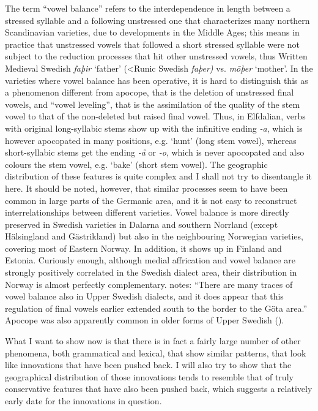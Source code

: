 The term “vowel balance” refers to the interdependence in length between a stressed syllable and a following unstressed one that characterizes many northern Scandinavian varieties, due to developments in the Middle Ages; this means in practice that unstressed vowels that followed a short stressed syllable were not subject to the reduction processes that hit other unstressed vowels, thus Written Medieval Swedish \textit{faþir }‘father’\textit{ }({\textless}Runic Swedish\textit{ faþer)} vs. \textit{m}\textit{\=oþ}\textit{er} ‘mother’.  In the varieties where vowel balance has been operative, it is hard to distinguish this as a phenomenon different from apocope, that is the deletion of unstressed final vowels, and “vowel leveling”, that is the assimilation of the quality of the stem vowel to that of the non-deleted but raised final vowel. Thus, in Elfdalian, verbs with original long-syllabic stems show up with the infinitive ending\textit{ {}-a}, which is however apocopated in many positions, e.g.  ‘hunt’ (long stem vowel), whereas short-syllabic stems get the ending\textit{ {}-å} or\textit{ {}-o}, which is never apocopated and also colours the stem vowel, e.g.  ‘bake’ (short stem vowel). The geographic distribution of these features is quite complex and I shall not try to disentangle it here. It should be noted, however, that similar processes seem to have been common in large parts of the Germanic area, and it is not easy to reconstruct interrelationships between different varieties. Vowel balance is more directly preserved in Swedish varieties in Dalarna and southern Norrland (except Hälsingland and Gästrikland) but also in the neighbouring Norwegian varieties, covering most of Eastern Norway. In addition, it shows up in Finland and Estonia. Curiously enough, although medial affrication and vowel balance are strongly positively correlated in the Swedish dialect area, their distribution in Norway is almost perfectly complementary. \citet[52]{Wessén1966} notes: “There are many traces of vowel balance also in Upper Swedish dialects, and it does appear that this regulation of final vowels earlier extended south to the border to the Göta area.” Apocope was also apparently common in older forms of Upper Swedish (\citealt{Wessén1968}).

What I want to show now is that there is in fact a fairly large number of other phenomena, both grammatical and lexical, that show similar patterns, that look like innovations that have been pushed back. I will also try to show that the geographical distribution of those innovations tends to resemble that of truly conservative features that have also been pushed back, which suggests a relatively early date for the innovations in question.

